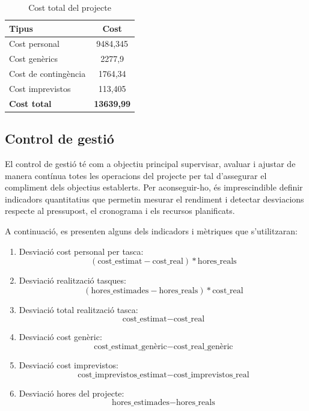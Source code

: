 \documentclass[a4paper,12pt]{report}
\begin{document}
\begin{table}[H]
    \centering
    \begin{tabular}{|l|c|}
    \hline
    \textbf{Tipus}       & \textbf{Cost}     \\ \hline
    Cost personal        & 9484,345          \\
    Cost genèrics        & 2277,9            \\
    Cost de contingència & 1764,34           \\
    Cost imprevistos     & 113,405           \\ \hline
    \textbf{Cost total}  & \textbf{13639,99} \\ \hline
    \end{tabular}
    \caption{Cost total del projecte}
    \label{tab:cost_total}
\end{table}

\subsection{Control de gestió}

El control de gestió té com a objectiu principal supervisar, avaluar i ajustar de manera contínua totes les operacions del projecte per tal d’assegurar el compliment dels objectius establerts. Per aconseguir-ho, és imprescindible definir indicadors quantitatius que permetin mesurar el rendiment i detectar desviacions respecte al pressupost, el cronograma i els recursos planificats.

A continuació, es presenten alguns dels indicadors i mètriques que s’utilitzaran:

\begin{enumerate}
    \item Desviació cost personal per tasca:
    \[
    (\text{cost\_estimat} - \text{cost\_real}) * \text{hores\_reals}
    \]

    \item Desviació realització tasques:
    \[
    (\text{hores\_estimades} - \text{hores\_reals}) * \text{cost\_real}
    \]

    \item Desviació total realització tasca:
    \[
    \text{cost\_estimat} - \text{cost\_real}
    \]

    \item Desviació cost genèric:
    \[
    \text{cost\_estimat\_genèric} - \text{cost\_real\_genèric}
    \]

    \item Desviació cost imprevistos:
    \[
    \text{cost\_imprevistos\_estimat} - \text{cost\_imprevistos\_real}
    \]

    \item Desviació hores del projecte:
    \[
    \text{hores\_estimades} - \text{hores\_reals}
    \]

\end{enumerate}
\end{document}
